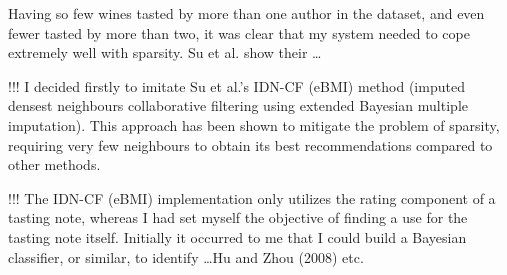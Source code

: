 
Having so few wines tasted by more than one author in the dataset, and even fewer tasted by more than two, it was clear that my system needed to cope extremely well with sparsity. Su et al. \cite{SuImputed} show their \ldots

!!! I decided firstly to imitate Su et al.'s \cite{SuImputed} IDN-CF (eBMI) method (imputed densest neighbours collaborative filtering using extended Bayesian multiple imputation). This approach has been shown to mitigate the problem of sparsity, requiring very few neighbours to obtain its best recommendations compared to other methods. 

!!! The IDN-CF (eBMI) implementation only utilizes the rating component of a tasting note, whereas I had set myself the objective of finding a use for the tasting note itself. Initially it occurred to me that I could build a Bayesian classifier, or similar, to identify \ldots Hu and Zhou (2008) etc.




